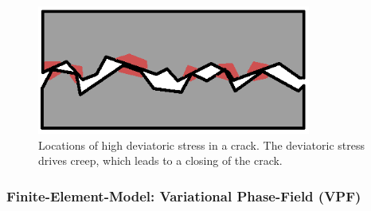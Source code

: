 \begin{figure}[!ht]
\centering
\includegraphics[width=9cm]{figures/mex3-crack-stresses.png}
\caption{Locations of high deviatoric stress in a crack. The deviatoric stress drives creep, which leads to a closing of the crack.}
\label{fig:ME3-crack-stre}
\end{figure}


\subsubsection*{Finite-Element-Model: Variational Phase-Field (VPF)}


